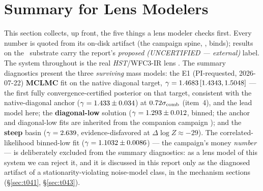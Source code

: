 \providecommand{\sboot}{\ensuremath{\sigma_{\mathrm{boot}}}}
\providecommand{\sseed}{\ensuremath{\sigma_{\mathrm{seed}}}}
\providecommand{\logZ}{\ensuremath{\log Z}}
\providecommand{\dlogZ}{\ensuremath{\Delta\log Z}}

\section{Summary for Lens Modelers}
\label{sec:modelers}

This section collects, up front, the five things a lens modeler checks
first. Every number is quoted from its on-disk artifact (the campaign spine,
, binds); results on the \sceneapi\
substrate carry the report's \emph{proposed (UNCERTIFIED --- external)}
label. The system throughout is the real {\it HST}/WFC3-IR lens \foundry.
The summary diagnostics present the three \emph{surviving} mass models:
the E1 (PI-requested, 2026-07-22) \textbf{MCLMC} fit on the \dfile{v2d}
native diagonal target, $\gamma = 1.4683\,[1.4343, 1.5048]$ --- the
first fully convergence-certified posterior on that target, consistent
with the native-diagonal anchor ($\gamma=1.433\pm0.034$) at
$0.72\sigma_{\rm comb}$ (item~4), and the lead model here; the
\textbf{diagonal-low} solution ($\gamma=1.293\pm0.012$, 
binned; the anchor and diagonal-low fits are inherited from the companion
campaign \citep{cgl2026companion}); and the \textbf{steep} basin
($\gamma=2.639$, evidence-disfavored at $\dlogZ\approx-29$). The
correlated-likelihood binned-low fit ($\gamma=1.1032\pm0.0086$) ---
the campaign's money \emph{number} --- is deliberately excluded from the
summary diagnostics: as a lens model of this system we can reject it, and
it is discussed in this report only as the diagnosed artifact of a
stationarity-violating noise-model class, in the mechanism sections
(\S\ref{sec:t041}, \S\ref{sec:t043}).\art{data/e1\_harvest.json}

